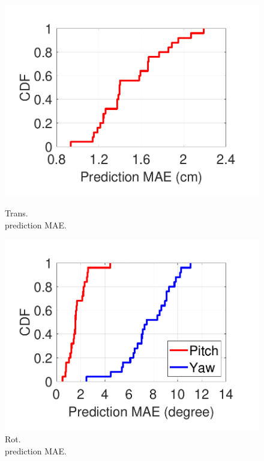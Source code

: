 \begin{figure}[t]
\begin{minipage}{.25\textwidth}
		\label{fig:total_pause}
	\end{minipage}
	\hspace{-.1in}
	\begin{minipage}{.25\textwidth}
		\centering
		\includegraphics[width=\linewidth]{figs/firefly/translation_mae.pdf} \vspace{-.25in}
		\caption{\small Trans.\\ prediction MAE.}
		\label{fig:translation_mae}
	\end{minipage}
	\hspace{-.1in}
	\begin{minipage}{.25\textwidth}
		\centering
		\includegraphics[width=\linewidth]{figs/firefly/rotation_mae.pdf} \vspace{-.25in}
		\caption{\small Rot.\\ prediction MAE.}
		\label{fig:rotation_mae}
	\end{minipage}
	\vspace{-.2in}
\end{figure}


